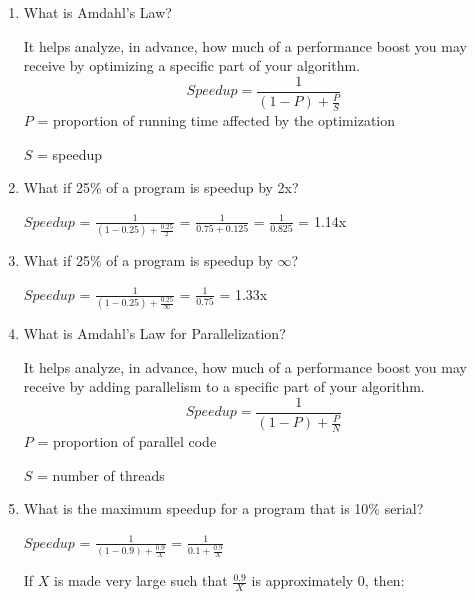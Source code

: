 \documentclass[12pt]{article}
\newenvironment{QandA}{\begin{enumerate}[label=\bfseries\arabic*.]\bfseries}
                      {\end{enumerate}}
\newenvironment{answered}{\par\quad\normalfont}{}
\begin{document}
\begin{QandA}
    \item What is Amdahl's Law?
        \begin{answered}
        It helps analyze, in advance, how much of a performance boost you may receive by optimizing a specific part of your algorithm. 
        \begin{equation}
            Speedup = \frac{1}{(1-P)+\frac{P}{S}}
        \end{equation}
        $P$ = proportion of running time affected by the optimization
        
        $S$ = speedup
        \end{answered}
        
    \item What if 25\% of a program is speedup by 2x?
        \begin{answered}
        $Speedup$ = $\frac{1}{(1-0.25) + \frac{0.25}{2}}$ = $\frac{1}{0.75 + 0.125}$ = $\frac{1}{0.825}$ = 1.14x
        \end{answered}
        
    \item What if 25\% of a program is speedup by $\infty$?
        \begin{answered}
        $Speedup$ = $\frac{1}{(1-0.25) + \frac{0.25}{\infty}}$ = $\frac{1}{0.75}$ = 1.33x
        \end{answered}
        
    \item What is Amdahl's Law for Parallelization?
        \begin{answered}
        It helps analyze, in advance, how much of a performance boost you may receive by adding parallelism to a specific part of your algorithm. 
        \begin{equation}
            Speedup = \frac{1}{(1-P)+\frac{P}{N}}
        \end{equation}
        $P$ = proportion of parallel code
        
        $S$ = number of threads
        \end{answered}
    
    \item What is the maximum speedup for a program that is 10\% serial?
        \begin{answered}
        $Speedup$ = $\frac{1}{(1-0.9) + \frac{0.9}{X}}$ = $\frac{1}{0.1 + \frac{0.9}{X}}$
        
        If $X$ is made very large such that $\frac{0.9}{X}$ is approximately $0$, then:
        

\end{answered}
\end{QandA}
\end{document}
